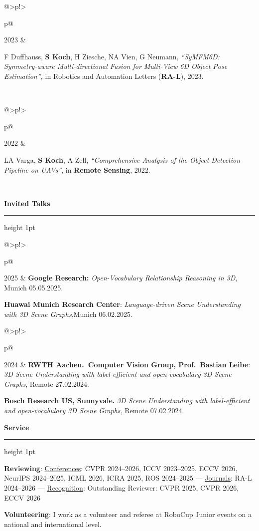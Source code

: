 \documentclass{article}
\makeatletter
\newcommand{\bodysize}{\fontsize{10.5}{13.49}\selectfont}
\newcommand{\compactsize}{\fontsize{10.5}{12.53}\selectfont}
\newcommand{\datesize}{\fontsize{9}{11.56}\selectfont}
\newlength{\dcw}   %
\newlength{\ccw}   %
\newcommand{\datebar}{\kern0.075in{\color{dategray}\vrule width 1pt}\kern0.075in}
\newcommand{\datestyle}{\raggedleft\arraybackslash\datesize\leavevmode\color{dategray}}
\newenvironment{cvtable}[2][\bodysize]{%
  \setlength{\dcw}{#2}%
  \setlength{\ccw}{\dimexpr\textwidth-\dcw-0.314in\relax}%
  \setlength{\LTpre}{3.2pt}\setlength{\LTpost}{0pt}%
  \setlength{\LTleft}{0pt}\setlength{\LTright}{\fill}%
  \setlength{\tabcolsep}{0pt}%
  \begin{longtable}{@{\kern0.075in}>{\datestyle}p{\dcw}!{\datebar}>{\raggedright\arraybackslash#1}p{\ccw}@{}}%
}{\end{longtable}\vspace{\entrygap}}
\newcommand{\pubitem}[1]{{\hangindent=0.221in \hangafter=1 \noindent#1\par}}
\newlength{\entrygap}\setlength{\entrygap}{4.6pt}
\newcommand{\cvsection}[2][14pt]{%
  \par\vspace{#1}%
  {\noindent\fontsize{11}{13.2}\selectfont\bfseries #2\par}%
  \vspace{2pt}\hrule height 1pt
  \vspace{5pt}}
\makeatother
\begin{document}
\begin{cvtable}[\compactsize]{0.441in}
2023 &
  \pubitem{[10] F Duffhauss, \textbf{S Koch}, H Ziesche, NA Vien, G Neumann, \textit{``SyMFM6D: Symmetry-aware Multi-directional Fusion for Multi-View 6D Object Pose Estimation'',} in Robotics and Automation Letters (\textbf{RA-L}), 2023.}\\
\end{cvtable}

\begin{cvtable}[\compactsize]{0.441in}
2022 &
  \pubitem{[11] LA Varga, \textbf{S Koch}, A Zell, \textit{``Comprehensive Analysis of the Object Detection Pipeline on UAVs''}, in \textbf{Remote Sensing}, 2022.}\\
\end{cvtable}

\setlength{\entrygap}{3.6pt}
\cvsection[10.4pt]{Invited Talks}

\begin{cvtable}[\compactsize]{0.441in}
2025 &
  \textbf{Google Research:} \textit{Open-Vocabulary Relationship Reasoning in 3D}, Munich 05.05.2025.\par
  \vspace{3.5pt}
  \textbf{Huawai Munich Research Center}: \textit{Language-driven Scene Understanding with 3D Scene Graphs},\newline Munich 06.02.2025.\\
\end{cvtable}

\begin{cvtable}[\compactsize]{0.441in}
2024 &
  \textbf{RWTH Aachen.\ Computer Vision Group, Prof.\ Bastian Leibe}: \textit{3D Scene Understanding with label-efficient and open-vocabulary 3D Scene Graphs}, Remote 27.02.2024.\par
  \vspace{3.5pt}
  \textbf{Bosch Research US, Sunnyvale.} \textit{3D Scene Understanding with label-efficient and open-vocabulary 3D Scene Graphs}, Remote 07.02.2024.\\
\end{cvtable}

\cvsection[9pt]{Service}

\begingroup\fontsize{10.5}{13.6}\selectfont
{}
\noindent
\textbf{Reviewing}: \underline{Conferences}: CVPR 2024--2026, ICCV 2023--2025, ECCV 2026, NeurIPS 2024--2025, ICML 2026, ICRA 2025, ROS 2024--2025 --- \underline{Journals}: RA-L 2024--2026 --- \underline{Recognition}: Outstanding Reviewer: CVPR 2025, CVPR 2026, ECCV 2026\par
\textbf{Volunteering}: I work as a volunteer and referee at RoboCup Junior events on a national and international level.\par
\endgroup
\end{document}
